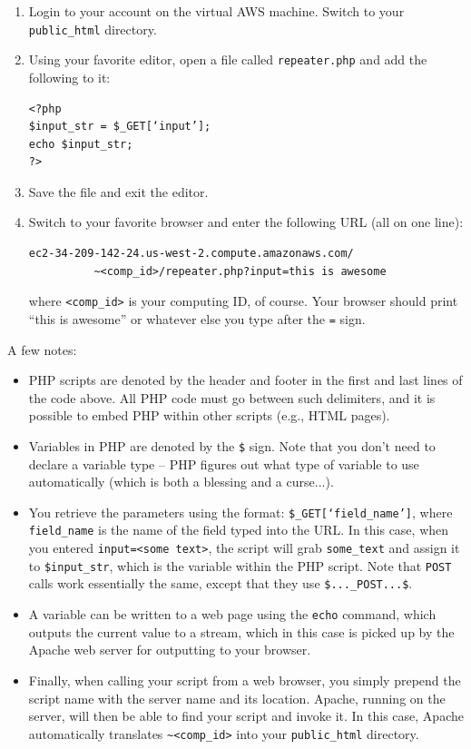 \documentclass[11pt]{article} %
\begin{document}
\begin{enumerate}
\item Login to your account on the virtual AWS machine. Switch to your \verb|public_html| directory.
\item Using your favorite editor, open a file called \verb|repeater.php| and add the following to it:

\begin{verbatim}
<?php
$input_str = $_GET[‘input’];
echo $input_str;
?>
\end{verbatim}
\item Save the file and exit the editor.
\item Switch to your favorite browser and enter the following URL (all on one line):

\begin{verbatim}
ec2-34-209-142-24.us-west-2.compute.amazonaws.com/
          ~<comp_id>/repeater.php?input=this is awesome
\end{verbatim}

where \verb|<comp_id>| is your computing ID, of course. Your browser should print “this is awesome” or whatever else you type after the \verb|=| sign.

\end{enumerate}

A few notes:

\begin{itemize}
\item PHP scripts are denoted by the header and footer in the first and last lines of the code above. All PHP code must go between such delimiters, and it is possible to embed PHP within other scripts (e.g., HTML pages).
\item Variables in PHP are denoted by the \verb|$| sign. Note that you don’t need to declare a variable type -- PHP figures out what type of variable to use automatically (which is both a blessing and a curse...).
\item You retrieve the parameters using the format: \verb|$_GET[‘field_name’]|, where \verb|field_name| is the name of the field typed into the URL. In this case, when you entered \verb|input=<some text>|, the script will grab \verb|some_text| and assign it to \verb|$input_str|, which is the variable within the PHP script. Note that \verb|POST| calls work essentially the same, except that they use \verb|$..._POST...$|.
\item A variable can be written to a web page using the \verb|echo| command, which outputs the current value to a stream, which in this case is picked up by the Apache web server for outputting to your browser.
\item Finally, when calling your script from a web browser, you simply prepend the script name with the server name and its location. Apache, running on the server, will then be able to find your script and invoke it. In this case, Apache automatically translates \verb|~<comp_id>| into your \verb|public_html| directory.
\end{itemize}
\end{document}

